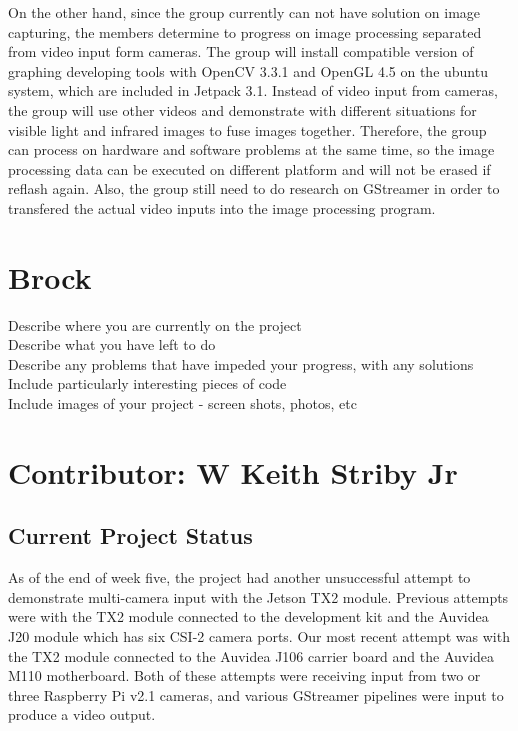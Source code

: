 \documentclass[letterpaper,10pt,serif,draftclsnofoot,onecolumn,compsoc,titlepage]{IEEEtran}
\begin{document}
 On the other hand, since the group currently can not have solution on image capturing, the members 
 determine to progress on image processing separated from video input form cameras. The group will 
 install compatible version of graphing developing tools with OpenCV 3.3.1 and OpenGL 4.5 on the ubuntu 
 system, which are included in Jetpack 3.1. Instead of video input from cameras, the group will use 
 other videos and demonstrate with different situations for visible light and infrared images to fuse 
 images together. Therefore, the group can process on hardware and software problems at the same time, 
 so the image processing data can be executed on different platform and will not be erased if reflash again. 
 Also, the group still need to do research on GStreamer in order to transfered the actual video inputs 
 into the image processing program.\\


\section{Brock}
Describe where you are currently on the project \\

Describe what you have left to do \\

Describe any problems that have impeded your progress, with any solutions \\

Include particularly interesting pieces of code \\

Include images of your project - screen shots, photos, etc \\


\section{Contributor: W Keith Striby Jr}

\subsection{Current Project Status}

As of the end of week five, the project had another unsuccessful attempt to demonstrate 
multi-camera input with the Jetson TX2 module. Previous attempts were with the TX2 module
connected to the development kit and the Auvidea J20 module which has six CSI-2 camera 
ports. Our most recent attempt was with the TX2 module connected to the Auvidea J106 
carrier board and the Auvidea M110 motherboard. Both of these attempts were receiving 
input from two or three Raspberry Pi v2.1 cameras, and various GStreamer 
pipelines were input to produce a video output. \\
\end{document}
